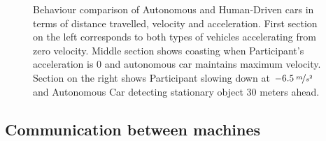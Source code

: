 \documentclass[11pt,english,twoside]{article}
\begin{document}
\begin{figure}[!] %
\caption{Behaviour comparison of Autonomous and Human-Driven cars in terms of distance travelled, velocity and acceleration. First section on the left corresponds to both types of vehicles accelerating from zero velocity. Middle section shows coasting when Participant's acceleration is 0 and autonomous car maintains maximum velocity. Section on the right shows Participant slowing down at $-6.5\:\nicefrac{m}{s^2}$ and Autonomous Car detecting stationary object 30 meters ahead.}
\label{fig:super_graph}
\end{figure} 






\subsection{Communication between machines}
\end{document}
